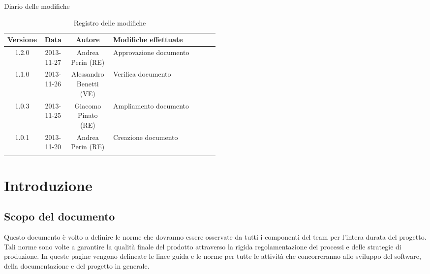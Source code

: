 
\newpage
Diario delle modifiche
\begin{center}
\begin{longtable}{|c|c|c|p{0.5\linewidth}|}
\toprule
\textbf{Versione} & \textbf{Data} & \textbf{Autore} & \textbf{Modifiche effettuate}\\


\midrule
1.2.0 & 2013-11-27 & Andrea Perin (RE) & Approvazione documento\\
\midrule
1.1.0 & 2013-11-26 & Alessandro Benetti (VE) & Verifica documento\\
\midrule
1.0.3 & 2013-11-25 & Giacomo Pinato (RE) & Ampliamento documento\\
\midrule
1.0.1 & 2013-11-20 & Andrea Perin (RE) & Creazione documento\\

\bottomrule
\caption{Registro delle modifiche}
\label{tab:changelog}
\end{longtable}
\end{center}

\newpage
\tableofcontents


\newpage
\section{Introduzione}%
\label{1.0}
\subsection{Scopo del documento}%
\label{1.1}
Questo documento è volto a definire le norme che dovranno essere osservate da tutti i componenti del team per l'intera durata del progetto. Tali norme sono volte a garantire la qualità finale del prodotto attraverso la rigida regolamentazione dei processi e delle strategie di produzione. In queste pagine vengono delineate le linee guida e le norme per tutte le attività che concorreranno allo sviluppo del software, della documentazione e del progetto in generale.

